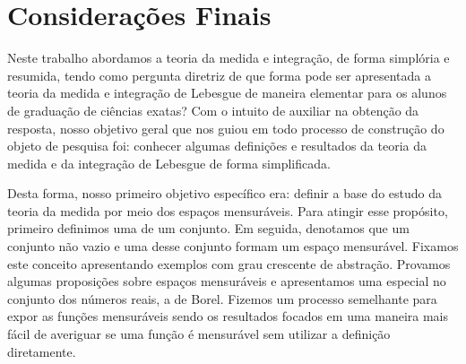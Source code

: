 




\chapter{Considerações Finais}
	Neste trabalho abordamos a teoria da medida e integração, de forma simplória e resumida, tendo como pergunta diretriz de que forma pode ser apresentada a teoria da medida e integração de Lebesgue de maneira elementar para os alunos de graduação de ciências exatas?
	Com o intuito de auxiliar na obtenção da resposta, nosso objetivo geral que nos guiou em todo processo de construção do objeto de pesquisa foi: 
	conhecer algumas definições e resultados da teoria da medida e da integração de Lebesgue de forma simplificada.
	
	Desta forma, nosso primeiro objetivo específico era: definir a base do estudo da teoria da medida por meio dos espaços mensuráveis.
	Para atingir esse propósito, primeiro definimos  uma \sigal de um conjunto.
	Em seguida, denotamos que um conjunto não vazio e uma \sigal desse conjunto formam um espaço mensurável.
	Fixamos este conceito apresentando exemplos com grau crescente de abstração.
	Provamos algumas proposições sobre espaços mensuráveis e apresentamos uma \sigal especial no conjunto dos números reais, a \sigal de Borel.
	Fizemos um processo semelhante para expor as funções mensuráveis sendo os resultados focados em uma maneira mais fácil de averiguar se uma função é mensurável sem utilizar a definição diretamente.
	
